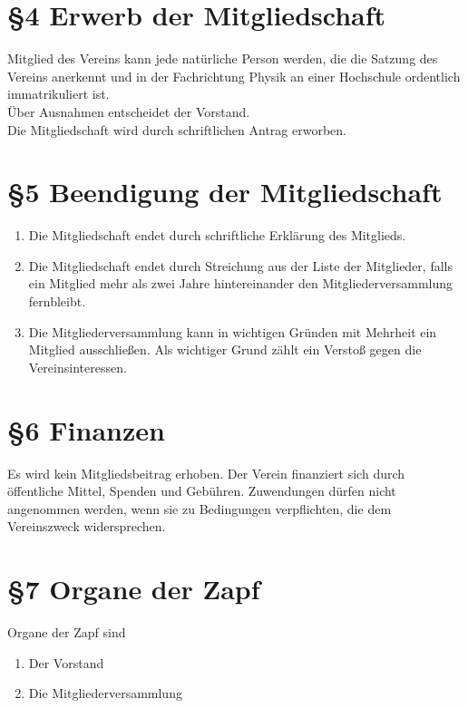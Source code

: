 \documentclass[ngerman]{article}
\begin{document}
\section*{§4 Erwerb der Mitgliedschaft}
Mitglied des Vereins kann jede natürliche Person werden, die die Satzung des Vereins anerkennt und in der Fachrichtung Physik an einer Hochschule ordentlich immatrikuliert ist.\\
Über Ausnahmen entscheidet der Vorstand.\\
Die Mitgliedschaft wird durch schriftlichen Antrag erworben.


\section*{§5 Beendigung der Mitgliedschaft}
\begin{enumerate}
 \item Die Mitgliedschaft endet durch schriftliche Erklärung des Mitglieds.
 \item Die Mitgliedschaft endet durch Streichung aus der Liste der Mitglieder, falls ein Mitglied mehr als zwei Jahre hintereinander
   den Mitgliederversammlung fernbleibt.
 \item Die Mitgliederversammlung kann in wichtigen Gründen mit \textthreequarters Mehrheit ein Mitglied ausschließen. Als wichtiger Grund zählt ein Verstoß gegen die Vereinsinteressen.
\end{enumerate}


\section*{§6 Finanzen}
Es wird kein Mitgliedsbeitrag erhoben. Der Verein finanziert sich durch öffentliche Mittel, Spenden und Gebühren. Zuwendungen dürfen nicht angenommen werden, wenn sie zu Bedingungen verpflichten, die dem Vereinszweck widersprechen.


\section*{§7 Organe der Zapf}
Organe der Zapf sind
\begin{enumerate}
 \item Der Vorstand
 \item Die Mitgliederversammlung
\end{enumerate}
\end{document}
